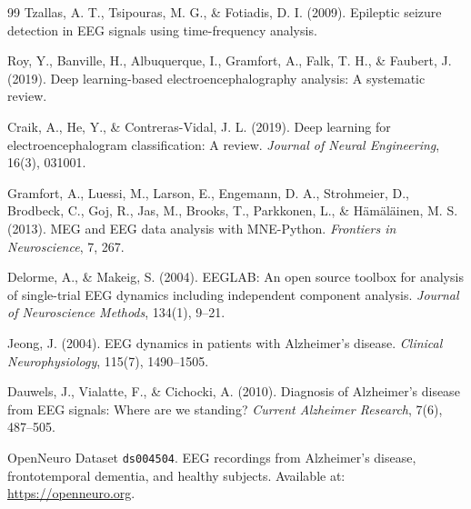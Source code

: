 \documentclass[12pt,a4paper]{article}
\begin{document}
\begin{thebibliography}{99}
Tzallas, A. T., Tsipouras, M. G., \& Fotiadis, D. I. (2009). Epileptic seizure detection in EEG signals using time-frequency analysis.

Roy, Y., Banville, H., Albuquerque, I., Gramfort, A., Falk, T. H., \& Faubert, J. (2019). Deep learning-based electroencephalography analysis: A systematic review.

Craik, A., He, Y., \& Contreras-Vidal, J. L. (2019). Deep learning for electroencephalogram classification: A review. \textit{Journal of Neural Engineering}, 16(3), 031001.

Gramfort, A., Luessi, M., Larson, E., Engemann, D. A., Strohmeier, D., Brodbeck, C., Goj, R., Jas, M., Brooks, T., Parkkonen, L., \& H\"am\"al\"ainen, M. S. (2013). MEG and EEG data analysis with MNE-Python. \textit{Frontiers in Neuroscience}, 7, 267.

Delorme, A., \& Makeig, S. (2004). EEGLAB: An open source toolbox for analysis of single-trial EEG dynamics including independent component analysis. \textit{Journal of Neuroscience Methods}, 134(1), 9--21.

Jeong, J. (2004). EEG dynamics in patients with Alzheimer’s disease. \textit{Clinical Neurophysiology}, 115(7), 1490--1505.

Dauwels, J., Vialatte, F., \& Cichocki, A. (2010). Diagnosis of Alzheimer’s disease from EEG signals: Where are we standing? \textit{Current Alzheimer Research}, 7(6), 487--505.

OpenNeuro Dataset \texttt{ds004504}. EEG recordings from Alzheimer’s disease, frontotemporal dementia, and healthy subjects. Available at: \url{https://openneuro.org}.

\end{thebibliography}
\end{document}

